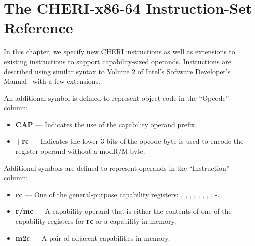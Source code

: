 \chapter{The CHERI-x86-64 Instruction-Set Reference}
\label{chap:isaref-x86-64}


\newenvironment{x86opcodetable}{%
  \tabularx{\textwidth}{| l | l | p{2.0em} | p{2.5em} | p{2.5em} | Z |} \hline
    \textbf{Opcode} & \textbf{Instruction} & \textbf{Op/ En} &
    \textbf{Cap Mode} & \textbf{64-bit Mode} & \textbf{Description}\\
    \hline
}{%
  \endtabularx
}

\newcommand{\xopcode}[6]{%
  #1 & #2 & #3 & #4 & #5 & #6\\
  \hline
}

\newenvironment{x86opentable}{%
  \bigskip
  \noindent
  \tabularx{\textwidth}{| c | Y | Y | Y | Y |}
    \multicolumn{5}{c}{\bfseries Instruction Operand Encoding}\\
    \hline
    Op/En & Operand 1 & Operand 2 & Operand 3 & Operand 4\\
    \hline
}{%
  \endtabularx
}

\newcommand{\xopen}[5]{%
  #1 & #2 & #3 & #4 & #5\\
  \hline
}

In this chapter, we specify new CHERI instructions as well as
extensions to existing instructions to support capability-sized
operands.  Instructions are described using similar syntax to Volume 2
of Intel's Software Developer's Manual~\cite{intel-sdm-vol2} with a
few extensions.

An additional symbol is defined to represent object code in the
``Opcode'' column:

\begin{itemize}
  \item \textbf{CAP} { }---{ } Indicates the use of the capability
    operand prefix.

  \item \textbf{+rc} { }---{ } Indicates the lower 3 bits of the
    opcode byte is used to encode the register operand without a
    modR/M byte.
\end{itemize}

Additional symbols are defined to represent operands in the
``Instruction'' column:

\begin{itemize}
  \item \textbf{rc} { }---{ } One of the general-purpose capability
    registers: \CAX{}, \CBX{}, \CCX{}, \CDX{}, \CDI{}, \CSI{}, \CBP{},
    \CSP{}, -.

  \item \textbf{r/mc} { }---{ } A capability operand that is either
    the contents of one of the capability registers for \textbf{rc} or
    a capability in memory.

  \item \textbf{m2c} { }---{ } A pair of adjacent capabilities in
    memory.
\end{itemize}


